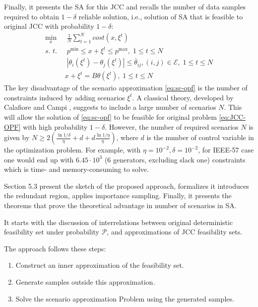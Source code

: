 Finally, it presents the SA for this JCC and recalls the number of data samples required to obtain $1-\delta$ reliable solution, i.e., solution of SA that is feasible to original JCC with probability $1-\delta$:
\begin{align}\label{eq:sc-opf}
  \min_x & \; \frac{1}{N} \sum_{t=1}^N \textit{cost}(x,\xi^t)\\
  \textit{s. t. } & \; p^{\min} \le x+\xi^t \le p^{\max}, \; 1\le t \le N\nonumber\\
  & \; |\theta_i(\xi^t) - \theta_j(\xi^t)| \le {\bar \theta}_{ij}, (i, j)\in \mathcal{E}, \; 1\le t \le N\nonumber\\
  & x+\xi^t = B \theta(\xi^t), \; 1\le t \le N\nonumber
\end{align}
The key disadvantage of the scenario approximation \eqref{eq:sc-opf} is the number of constraints induced by adding scenarios $\xi^t$. A classical theory, developed by Calafiore and Campi \cite{calafiore2006scenario}, suggests to include a large number of scenarios $N$. This will allow the solution of \eqref{eq:sc-opf} to be feasible for original problem \eqref{eq:JCC-OPF} with high probability $1 - \delta$. However, the number of required scenarios $N$ is given by $N \geq 2 \left( \frac{\ln{1/\delta}}{\eta} + d + d\frac{\ln{1/\eta}}{\eta} \right)$, where $d$ is the number of control variable in the optimization problem. For example, with $\eta = 10^{-2}, \delta = 10^{-2}$, for  IEEE-57 case one would end up with $6.45 \cdot 10^3$ (6 generators, excluding slack one) constraints which is time- and memory-consuming to solve.

Section 5.3 present the sketch of the proposed approach, formalizes it introduces the redundant region, applies importance sampling. Finally, it presents the theorems that prove the theoretical advantage in number of scenarios in SA.

It starts with the discussion of interrelations between original deterministic feasibility set under probability $\mathcal{P}$, and approximations of JCC feasibility sets. 

The approach follows these steps:

\begin{enumerate}
    \item Construct an inner approximation of the feasibility set.
    \item Generate samples outside this approximation.
    \item Solve the scenario approximation Problem using the generated samples.
\end{enumerate}



